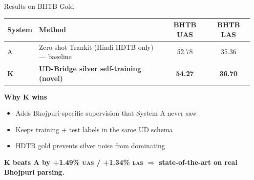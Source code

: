 \documentclass[aspectratio=169,10pt]{beamer}
\newcommand{\bho}{Bhojpuri}
\newcommand{\hi}{Hindi}
\newcommand{\uas}{\textsc{uas}}
\newcommand{\las}{\textsc{las}}
\begin{document}
\begin{frame}{Results on BHTB Gold}
\centering
\begin{tabular}{@{}llcc@{}}
\toprule
\textbf{System} & \textbf{Method} & \textbf{BHTB UAS} & \textbf{BHTB LAS} \\
\midrule
A & Zero-shot Trankit (\hi{} HDTB only) --- baseline     & 52.78 & 35.36 \\
\rowcolor{comp2!15}
\textbf{K} & \textbf{UD-Bridge silver self-training (novel)} & \textbf{54.27} & \textbf{36.70} \\
\bottomrule
\end{tabular}

\vspace{0.8cm}
\textbf{Why K wins}
\begin{itemize}
  \item Adds \bho{}-specific supervision that System A never saw
  \item Keeps training + test labels in the same UD schema
  \item HDTB gold prevents silver noise from dominating
\end{itemize}

\vspace{0.5cm}
\centering
\colorbox{comp2!15}{\textbf{K beats A by +1.49\% \uas{} / +1.34\% \las{} $\Rightarrow$ state-of-the-art on real \bho{} parsing.}}
\end{frame}
\end{document}
